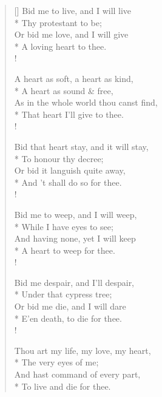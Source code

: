 \documentclass[MAIN]{subfiles}
\begin{document}
\settowidth{\versewidth}{So good luck came, and on my roof did light,}
\begin{verse}[\versewidth]
Bid me to live, and I will live\\*
\vin Thy protestant to be;\\
Or bid me love, and I will give\\*
\vin A loving heart to thee.\\!

A heart as soft, a heart as kind,\\*
\vin A heart as sound \& free,\\
As in the whole world thou canst find,\\*
\vin That heart I'll give to thee.\\!

Bid that heart stay, and it will stay,\\*
\vin To honour thy decree;\\
Or bid it languish quite away,\\*
\vin And 't shall do so for thee.\\!

Bid me to weep, and I will weep,\\*
\vin While I have eyes to see;\\
And having none, yet I will keep\\*
\vin A heart to weep for thee.\\!

Bid me despair, and I'll despair,\\*
\vin Under that cypress tree;\\
Or bid me die, and I will dare\\*
\vin E'en death, to die for thee.\\!

Thou art my life, my love, my heart,\\*
\vin The very eyes of me;\\
And hast command of every part,\\*
\vin To live and die for thee.
\end{verse}
\end{document}
